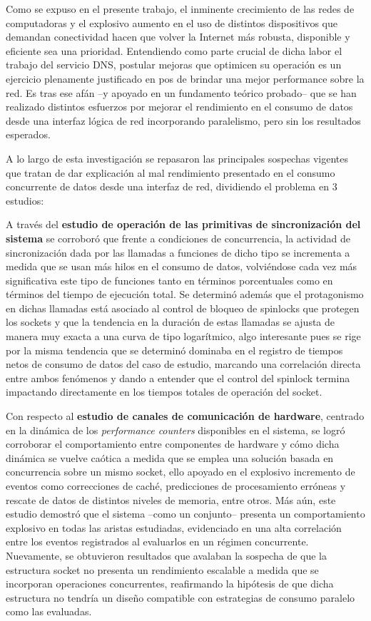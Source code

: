 \begin{conclusion}
Como se expuso en el presente trabajo, el inminente crecimiento de las redes de computadoras y el explosivo aumento en el uso de distintos dispositivos que demandan conectividad hacen que volver la Internet más robusta, disponible y eficiente sea una prioridad. Entendiendo como parte crucial de dicha labor el trabajo del servicio DNS, postular mejoras que optimicen su operación es un ejercicio plenamente justificado en pos de brindar una mejor performance sobre la red. Es tras ese afán --y apoyado en un fundamento teórico probado-- que se han realizado distintos esfuerzos por mejorar el rendimiento en el consumo de datos desde una interfaz lógica de red incorporando paralelismo, pero sin los resultados esperados. 
 
 
A lo largo de esta investigación se repasaron las principales sospechas vigentes que tratan de dar explicación al mal rendimiento presentado en el consumo concurrente de datos desde una interfaz de red, dividiendo el problema en 3 estudios: 
 
 
A través del \textbf{estudio de operación de las primitivas de sincronización del sistema} se corroboró que frente a condiciones de concurrencia, la actividad de sincronización dada por las llamadas a funciones de dicho tipo se incrementa a medida que se usan más hilos en el consumo de datos, volviéndose cada vez más significativa este tipo de funciones tanto en términos porcentuales como en términos del tiempo de ejecución total. Se determinó además que el protagonismo en dichas llamadas está asociado al control de bloqueo de spinlocks que protegen los sockets y que la tendencia en la duración de estas llamadas se ajusta de manera muy exacta a una curva de tipo logarítmico, algo interesante pues se rige por la misma tendencia que se determinó dominaba en el registro de tiempos netos de consumo de datos del caso de estudio, marcando una correlación directa entre ambos fenómenos y dando a entender que el control del spinlock termina impactando directamente en los tiempos totales de operación del socket. 
 
 
Con respecto al \textbf{estudio de canales de comunicación de hardware}, centrado en la dinámica de los \emph{performance counters} disponibles en el sistema, se logró corroborar el comportamiento entre componentes de hardware y cómo dicha dinámica se vuelve caótica a medida que se emplea una solución basada en concurrencia sobre un mismo socket, ello apoyado en el explosivo incremento de eventos como correcciones de caché, predicciones de procesamiento erróneas y rescate de datos de distintos niveles de memoria, entre otros. Más aún, este estudio demostró que el sistema --como un conjunto-- presenta un comportamiento explosivo en todas las aristas estudiadas, evidenciado en una alta correlación entre los eventos registrados al evaluarlos en un régimen concurrente. Nuevamente, se obtuvieron resultados que avalaban la sospecha de que la estructura socket no presenta un rendimiento escalable a medida que se incorporan operaciones concurrentes, reafirmando la hipótesis de que dicha estructura no tendría un diseño compatible con estrategias de consumo paralelo como las evaluadas. 
 

\end{conclusion}
